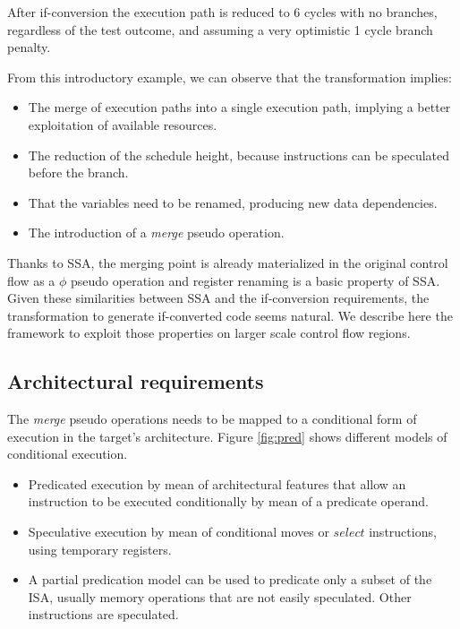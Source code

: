 After if-conversion the execution path is reduced to 6 cycles with no branches, regardless of the test outcome, and assuming a very optimistic 1 cycle branch penalty. 

From this introductory example, we can observe that the transformation implies:

\begin{itemize}
\item The merge of execution paths into a single execution path, implying a  better exploitation of available resources.  
\item The reduction of the schedule height, because instructions can be speculated before the branch.
\item That the variables need to be renamed, producing new data dependencies.
\item The introduction of a \textit{merge} pseudo operation.
\end{itemize}

Thanks to SSA, the merging point is already materialized in the original control flow as a $\phi$ pseudo operation and register renaming is a basic property of SSA. Given these similarities between SSA and the if-conversion requirements, the transformation to generate if-converted code seems natural. We describe here the framework to exploit those properties on larger scale control flow regions.

\subsection{Architectural requirements}

The \textit{merge} pseudo operations needs to be mapped to a conditional form of execution in the target's architecture. Figure \ref{fig:pred} shows different models of conditional execution.

\begin{itemize}
\item Predicated execution by mean of architectural features that allow an instruction to be executed conditionally by mean of a predicate operand.
\item Speculative execution by mean of conditional moves or $select$ instructions, using temporary registers. 
\item A partial predication model can be used to predicate only a subset of the ISA, usually memory operations that are not easily speculated. Other instructions are speculated.
\end{itemize}

